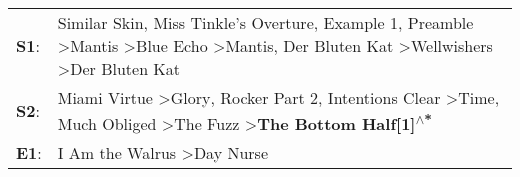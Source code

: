 \begin{supertabular}{p{0.03\textwidth}p{0.92\textwidth}}
 \textbf{S1}:  &  Similar Skin\textsuperscript{}, \enspace Miss Tinkle's Overture\textsuperscript{}, \enspace Example 1\textsuperscript{}, \enspace Preamble\textsuperscript{} \textgreater \enspace Mantis\textsuperscript{} \textgreater \enspace Blue Echo\textsuperscript{} \textgreater \enspace Mantis\textsuperscript{}, \enspace Der Bluten Kat\textsuperscript{} \textgreater \enspace Wellwishers\textsuperscript{} \textgreater \enspace Der Bluten Kat\textsuperscript{}  \enspace  \\
 \textbf{S2}:  &                                                                             Miami Virtue\textsuperscript{} \textgreater \enspace Glory\textsuperscript{}, \enspace Rocker Part 2\textsuperscript{}, \enspace Intentions Clear\textsuperscript{} \textgreater \enspace Time\textsuperscript{}, \enspace Much Obliged\textsuperscript{} \textgreater \enspace The Fuzz\textsuperscript{} \textgreater \enspace \textbf{The Bottom Half[1]\textsuperscript{$\wedge$*}}  \enspace  \\
 \textbf{E1}:  &                                                                                                                                                                                                                                                                                                                                                                                 I Am the Walrus\textsuperscript{} \textgreater \enspace Day Nurse\textsuperscript{}  \enspace  \\
\end{supertabular}
